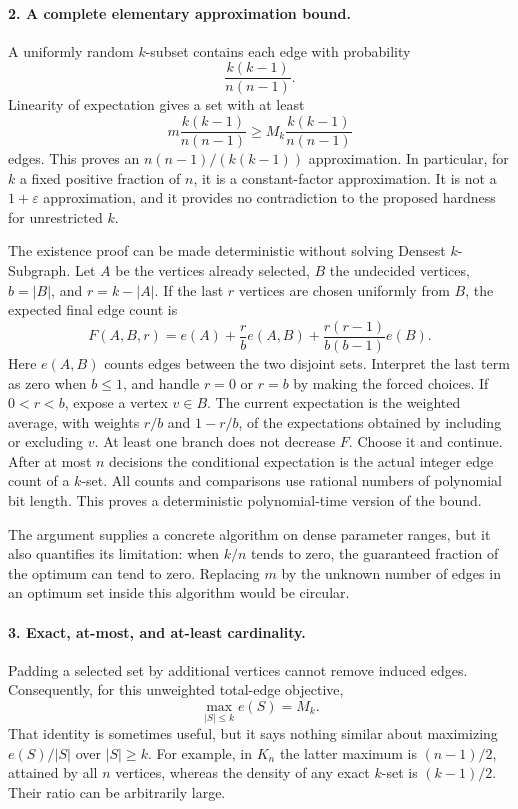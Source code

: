 \documentclass[11pt]{article}
\begin{document}
\paragraph{2. A complete elementary approximation bound.}
A uniformly random $k$-subset contains each edge with probability
\[
 \frac{k(k-1)}{n(n-1)}.
\]
Linearity of expectation gives a set with at least
\[
 m\frac{k(k-1)}{n(n-1)}
 \ge M_k\frac{k(k-1)}{n(n-1)}
\]
edges. This proves an $n(n-1)/(k(k-1))$ approximation. In particular, for $k$ a fixed positive fraction of $n$, it is a constant-factor approximation. It is not a $1+\varepsilon$ approximation, and it provides no contradiction to the proposed hardness for unrestricted $k$.

The existence proof can be made deterministic without solving Densest $k$-Subgraph. Let $A$ be the vertices already selected, $B$ the undecided vertices, $b=|B|$, and $r=k-|A|$. If the last $r$ vertices are chosen uniformly from $B$, the expected final edge count is
\[
 F(A,B,r)=e(A)+\frac{r}{b}e(A,B)
          +\frac{r(r-1)}{b(b-1)}e(B).
\]
Here $e(A,B)$ counts edges between the two disjoint sets. Interpret the last term as zero when $b\le1$, and handle $r=0$ or $r=b$ by making the forced choices. If $0<r<b$, expose a vertex $v\in B$. The current expectation is the weighted average, with weights $r/b$ and $1-r/b$, of the expectations obtained by including or excluding $v$. At least one branch does not decrease $F$. Choose it and continue. After at most $n$ decisions the conditional expectation is the actual integer edge count of a $k$-set. All counts and comparisons use rational numbers of polynomial bit length. This proves a deterministic polynomial-time version of the bound.

The argument supplies a concrete algorithm on dense parameter ranges, but it also quantifies its limitation: when $k/n$ tends to zero, the guaranteed fraction of the optimum can tend to zero. Replacing $m$ by the unknown number of edges in an optimum set inside this algorithm would be circular.

\paragraph{3. Exact, at-most, and at-least cardinality.}
Padding a selected set by additional vertices cannot remove induced edges. Consequently, for this unweighted total-edge objective,
\[
 \max_{|S|\le k}e(S)=M_k.
\]
That identity is sometimes useful, but it says nothing similar about maximizing $e(S)/|S|$ over $|S|\ge k$. For example, in $K_n$ the latter maximum is $(n-1)/2$, attained by all $n$ vertices, whereas the density of any exact $k$-set is $(k-1)/2$. Their ratio can be arbitrarily large.
\end{document}
